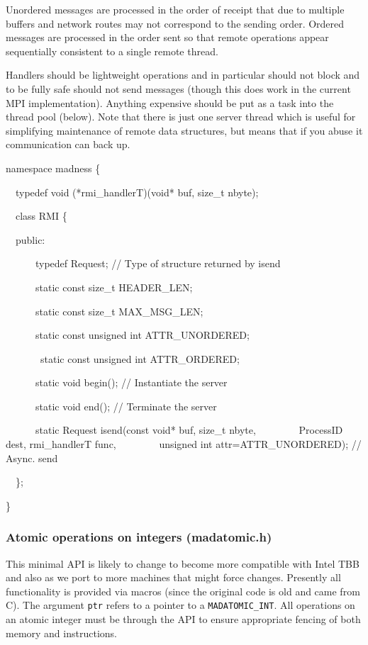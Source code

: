 \documentclass[letterpaper]{article}
\begin{document}
Unordered messages are processed in the order of receipt that due to multiple buffers and network routes may not
correspond to the sending order. Ordered messages are processed in the order sent so that remote operations appear
sequentially consistent to a single remote thread.

Handlers should be lightweight operations and in particular should not block and to be fully safe should not send
messages (though this does work in the current MPI implementation). Anything expensive should be put as a task into the
thread pool (below). Note that there is just one server thread which is useful for simplifying maintenance of remote
data structures, but means that if you abuse it communication can back up.

{\ttfamily
namespace madness \{}

{\ttfamily
\ \ typedef void (*rmi\_handlerT)(void* buf, size\_t nbyte);}

{\ttfamily
\ \ class RMI \{}

{\ttfamily
\ \ public:}

{\ttfamily
\ \ \ \ \ \ typedef Request; // Type of structure returned by isend}

{\ttfamily
\ \ \ \ \ \ static const size\_t HEADER\_LEN;}

{\ttfamily
\ \ \ \ \ \ static const size\_t MAX\_MSG\_LEN;}

{\ttfamily
\ \ \ \ \ \ static const unsigned int ATTR\_UNORDERED;}

{\ttfamily
\ \ \ \ \ \ \ static const unsigned int ATTR\_ORDERED;}

{\ttfamily
\ \ \ \ \ \ static void begin(); // Instantiate the server}

{\ttfamily
\ \ \ \ \ \ static void end(); // Terminate the server}

{\ttfamily
\ \ \ \ \ \ static Request isend(const void* buf, size\_t nbyte, \newline
\ \ \ \ \ \ \ \ ProcessID dest, rmi\_handlerT func, \newline
\ \ \ \ \ \ \ \ unsigned int attr=ATTR\_UNORDERED); // Async. send}

{\ttfamily
\ \ \};}

{\ttfamily
\}}

\subsubsection{Atomic operations on integers (madatomic.h)}
This minimal API is likely to change to become more compatible with Intel TBB and also as we port to more machines that
might force changes. Presently all functionality is provided via macros (since the original code is old and came from
C). The argument \texttt{ptr} refers to a pointer to a \texttt{MADATOMIC\_INT}. All operations on an atomic integer
must be through the API to ensure appropriate fencing of both memory and instructions. 
\end{document}
